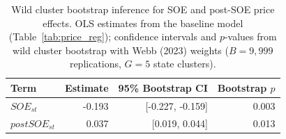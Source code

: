 \begin{table}[!h]
\centering
\caption{\label{tab:tab:price_wcb}Wild cluster bootstrap inference for SOE and post-SOE price effects. OLS estimates from the baseline model (Table~\ref{tab:price_reg}); confidence intervals and $p$-values from wild cluster bootstrap with Webb (2023) weights ($B = 9{,}999$ replications, $G = 5$ state clusters).}
\centering
\begin{tabular}[t]{lrrr}
\toprule
Term & Estimate & 95\% Bootstrap CI & Bootstrap $p$\\
\midrule
$SOE_{st}$ & -0.193 & {}[-0.227, -0.159] & 0.003\\
$postSOE_{st}$ & 0.037 & {}[0.019, 0.044] & 0.013\\
\bottomrule
\end{tabular}
\end{table}

